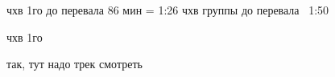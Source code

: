 





чхв 1го до перевала 86 мин = 1:26
чхв группы до перевала ~1:50

чхв 1го

так, тут надо трек смотреть

    \FloatBarrier
